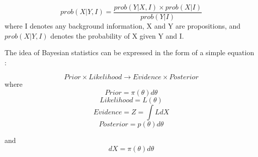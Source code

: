 \documentclass[a4paper,12pt]{article}
\begin{document}
\begin{equation}
 prob(X|Y,I) = \frac{prob(Y|X,I) \times prob(X|I)}{prob(Y|I)}
\end{equation}
where I denotes any background information, X and Y are propositions, and $prob(X|Y,I)$ denotes the probability of X given Y and I.

The idea of Bayesian statistics can be expressed in the form of a simple equation \cite{skilling}:

\begin{equation}
 Prior \times Likelihood \longrightarrow Evidence \times Posterior
\end{equation}
where
\begin{equation}
 Prior = \pi(\theta)d\theta 
\end{equation}
\begin{equation}
 Likelihood = L(\theta)
\end{equation}
\begin{equation}
 Evidence = Z = \int LdX
\end{equation}
\begin{equation}
 Posterior = p(\theta)d\theta
\end{equation}

and
\begin{equation}
 dX = \pi(\theta)d\theta
\end{equation}
\end{document}
